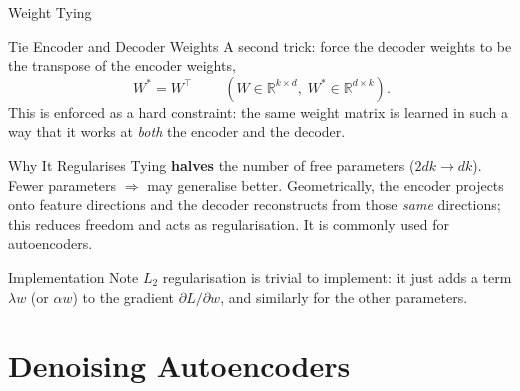 \documentclass{beamer}
\begin{document}
\begin{frame}[shrink=10]{Weight Tying}
  \begin{block}{Tie Encoder and Decoder Weights}
    A second trick: force the decoder weights to be the transpose of the
    encoder weights,
    \[
      \boxed{\;W^{*} = W^{\top}\;}
      \qquad (W \in \mathbb{R}^{k\times d},\; W^{*}\in\mathbb{R}^{d\times k}).
    \]
    This is enforced as a hard constraint: the same weight matrix is
    learned in such a way that it works at \emph{both} the encoder and the
    decoder.
  \end{block}

  \begin{block}{Why It Regularises}
    Tying \textbf{halves} the number of free parameters
    ($2dk \to dk$). Fewer parameters $\Rightarrow$ may generalise better.
    Geometrically, the encoder projects onto feature directions and the
    decoder reconstructs from those \emph{same} directions; this reduces
    freedom and acts as regularisation. It is commonly used for
    autoencoders.
  \end{block}

  \begin{exampleblock}{Implementation Note}
    $L_2$ regularisation is trivial to implement: it just adds a term
    $\lambda w$ (or $\alpha w$) to the gradient $\partial L/\partial w$,
    and similarly for the other parameters.
  \end{exampleblock}
\end{frame}

\section{Denoising Autoencoders}
\end{document}
